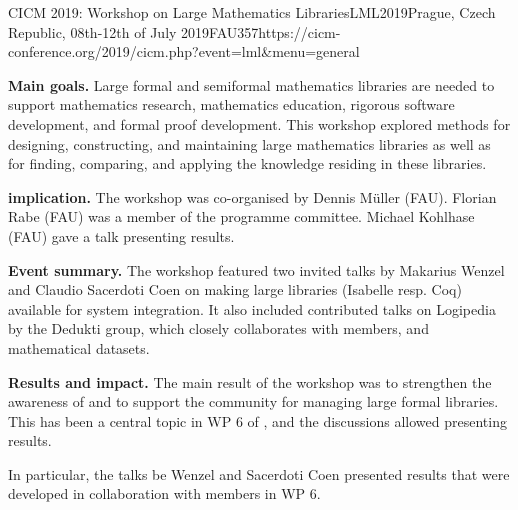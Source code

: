\begin{event}{CICM 2019: Workshop on Large Mathematics Libraries}{LML2019}{Prague, Czech Republic, 08th-12th of July 2019}{FAU}{35}{7}{https://cicm-conference.org/2019/cicm.php?event=lml&menu=general}

\textbf{Main goals.}
Large formal and semiformal mathematics libraries are needed to support mathematics research, mathematics education, rigorous software development, and formal proof development.
This workshop explored methods for designing, constructing, and maintaining large mathematics libraries as well as for finding, comparing, and applying the knowledge residing in these libraries. 

\textbf{\ODK implication.}
The workshop was co-organised by Dennis M\"uller (FAU).
Florian Rabe (FAU) was a member of the programme committee.
Michael Kohlhase (FAU) gave a talk presenting \ODK results.

\textbf{Event summary.}
The workshop featured two invited talks by Makarius Wenzel and Claudio Sacerdoti Coen on making large libraries (Isabelle resp. Coq) available for system integration.
It also included contributed talks on Logipedia by the Dedukti group, which closely collaborates with \ODK members, and mathematical datasets.

\textbf{Results and impact.}
The main result of the workshop was to strengthen the awareness of and to support the community for managing large formal libraries.
This has been a central topic in WP 6 of \ODK, and the discussions allowed presenting \ODK results.

In particular, the talks be Wenzel and Sacerdoti Coen presented results that were developed in collaboration with \ODK members in WP 6.
\end{event}

